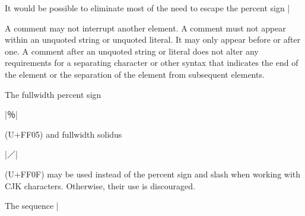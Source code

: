 \documentclass[11pt]{article}
\makeatletter
\let\orig@footnote\footnote
\renewcommand{\footnote}{%
  \begingroup
  \let\do\@makeother
  \dospecials
  \catcode`\{=1
  \catcode`\}=2
  \new@footnote}
\newcommand{\new@footnote}[1]{%
  \endgroup
  \orig@footnote{\scantokens{#1}}}
\newcommand{\bespon}{BespON}
\makeatother
\begin{document}
It would be possible to eliminate most of the need to escape the percent sign |%

A comment may not interrupt another element.  A comment must not appear within an unquoted string or unquoted literal.  It may only appear before or after one.  A comment after an unquoted string or literal does not alter any requirements for a separating character or other syntax that indicates the end of the element or the separation of the element from subsequent elements.

The fullwidth percent sign \begin{CJK*}{UTF8}{gkai}|％|\end{CJK*} (U+FF05) and fullwidth solidus \begin{CJK*}{UTF8}{gkai}|／|\end{CJK*} (U+FF0F) may be used instead of the percent sign and slash when working with CJK characters.  Otherwise, their use is discouraged.

The sequence |%
\end{document}
